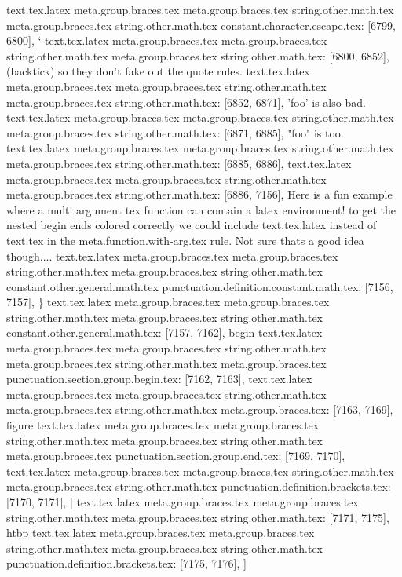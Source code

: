 {{{{{{{{{{{{{{{{{{{{{{{{{{{{{{{{{{{{{{{{{{{{{{{{{{{{{{{{{{{{{{{{{{{{{{{{{{{{{{{{{{{{{{{{{{{{{{{{{{{{{{{{{{{{{{{{{{{{{{{{{{{{{{{{{{{{{{{{{{{{{{{{{{{{{{{{{{{{{{{{{{{{{{{{{{{{{{{{{{{{{{{{{{text.tex.latex meta.group.braces.tex meta.group.braces.tex string.other.math.tex meta.group.braces.tex string.other.math.tex constant.character.escape.tex: [6799, 6800], {`}
text.tex.latex meta.group.braces.tex meta.group.braces.tex string.other.math.tex meta.group.braces.tex string.other.math.tex: [6800, 6852], { (backtick) so they don't fake out the quote rules.
}
text.tex.latex meta.group.braces.tex meta.group.braces.tex string.other.math.tex meta.group.braces.tex string.other.math.tex: [6852, 6871], {'foo' is also bad.
}
text.tex.latex meta.group.braces.tex meta.group.braces.tex string.other.math.tex meta.group.braces.tex string.other.math.tex: [6871, 6885], {"foo" is too.
}
text.tex.latex meta.group.braces.tex meta.group.braces.tex string.other.math.tex meta.group.braces.tex string.other.math.tex: [6885, 6886], {
}
text.tex.latex meta.group.braces.tex meta.group.braces.tex string.other.math.tex meta.group.braces.tex string.other.math.tex: [6886, 7156], {Here is a fun example where a multi argument tex function can contain a latex environment!  to get the nested begin ends colored correctly we could include text.tex.latex instead of text.tex in the meta.function.with-arg.tex rule.  Not sure thats a good idea though....
}
text.tex.latex meta.group.braces.tex meta.group.braces.tex string.other.math.tex meta.group.braces.tex string.other.math.tex constant.other.general.math.tex punctuation.definition.constant.math.tex: [7156, 7157], {\}
text.tex.latex meta.group.braces.tex meta.group.braces.tex string.other.math.tex meta.group.braces.tex string.other.math.tex constant.other.general.math.tex: [7157, 7162], {begin}
text.tex.latex meta.group.braces.tex meta.group.braces.tex string.other.math.tex meta.group.braces.tex string.other.math.tex meta.group.braces.tex punctuation.section.group.begin.tex: [7162, 7163], {{}
text.tex.latex meta.group.braces.tex meta.group.braces.tex string.other.math.tex meta.group.braces.tex string.other.math.tex meta.group.braces.tex: [7163, 7169], {figure}
text.tex.latex meta.group.braces.tex meta.group.braces.tex string.other.math.tex meta.group.braces.tex string.other.math.tex meta.group.braces.tex punctuation.section.group.end.tex: [7169, 7170], {}}
text.tex.latex meta.group.braces.tex meta.group.braces.tex string.other.math.tex meta.group.braces.tex string.other.math.tex punctuation.definition.brackets.tex: [7170, 7171], {[}
text.tex.latex meta.group.braces.tex meta.group.braces.tex string.other.math.tex meta.group.braces.tex string.other.math.tex: [7171, 7175], {htbp}
text.tex.latex meta.group.braces.tex meta.group.braces.tex string.other.math.tex meta.group.braces.tex string.other.math.tex punctuation.definition.brackets.tex: [7175, 7176], {]}
}}}}}}}}}}}}}}}}}}}}}}}}}}}}}}}}}}}}}}}}}}}}}}}}}}}}}}}}}}}}}}}}}}}}}}}}}}}}}}}}}}}}}}}}}}}}}}}}}}}}}}}}}}}}}}}}}}}}}}}}}}}}}}}}}}}}}}}}}}}}}}}}}}}}}}}}}}}}}}}}}}}}}}}}}}}}}}}}}}}}}}}}}}}
